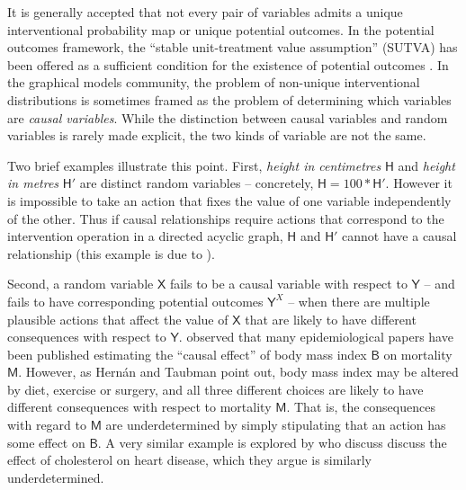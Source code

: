 \documentclass{article}
\theoremstyle{plain}
\theoremstyle{definition}
\newcommand{\RV}[1]{\ensuremath{\mathsf{#1}}}
\begin{document}
It is generally accepted that not every pair of variables admits a unique interventional probability map or unique potential outcomes. In the potential outcomes framework, the ``stable unit-treatment value assumption'' (SUTVA) has been offered as a sufficient condition for the existence of potential outcomes \citet{rubin_causal_2005,imbens_causal_2015}. In the graphical models community, the problem of non-unique interventional distributions is sometimes framed as the problem of determining which variables are \emph{causal variables}. While the distinction between causal variables and random variables is rarely made explicit, the two kinds of variable are not the same.

Two brief examples illustrate this point. First, \emph{height in centimetres} $\RV{H}$ and \emph{height in metres} $\RV{H}'$ are distinct random variables -- concretely, $\RV{H}=100*\RV{H}'$. However it is impossible to take an action that fixes the value of one variable independently of the other. Thus if causal relationships require actions that correspond to the intervention operation in a directed acyclic graph, $\RV{H}$ and $\RV{H}'$ cannot have a causal relationship (this example is due to \citet{eberhardt_contemporary_2022}).

Second, a random variable $\RV{X}$ fails to be a causal variable with respect to $\RV{Y}$ -- and fails to have corresponding potential outcomes $\RV{Y}^X$ -- when there are multiple plausible actions that affect the value of $\RV{X}$ that are likely to have different consequences with respect to $\RV{Y}$. \citet{hernan_does_2008} observed that many epidemiological papers have been published estimating the ``causal effect'' of body mass index $\RV{B}$ on mortality $\RV{M}$. However, as Hernán and Taubman point out, body mass index may be altered by diet, exercise or surgery, and all three different choices are likely to have different consequences with respect to mortality $\RV{M}$. That is, the consequences with regard to $\RV{M}$ are underdetermined by simply stipulating that an action has some effect on $\RV{B}$. A very similar example is explored by  \citet{spirtes_causal_2004,eberhardt_contemporary_2022} who discuss discuss the effect of cholesterol on heart disease, which they argue is similarly underdetermined.

\end{document}
